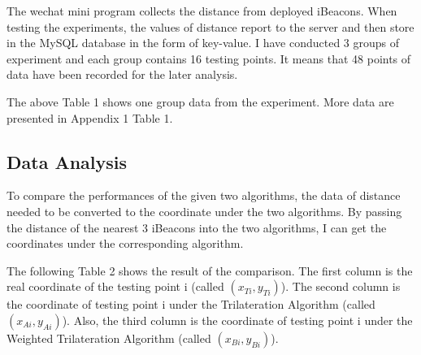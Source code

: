 \documentclass{sigchi}
\begin{document}
The wechat mini program collects the distance from deployed iBeacons. When testing the experiments, the values of distance report to the server and then store in the MySQL database in the form of key-value. I have conducted 3 groups of experiment and each group contains 16 testing points. It means that 48 points of data have been recorded for the later analysis. 

The above Table 1 shows one group data from the experiment. More data are presented in Appendix 1 Table 1.

\subsection{Data Analysis}
To compare the performances of the given two algorithms, the data of distance needed to be converted to the coordinate under the two algorithms. By passing the distance of the nearest 3 iBeacons into the two algorithms, I can get the coordinates under the corresponding algorithm.

The following Table 2 shows the result of the comparison. The first column is the real coordinate of the testing point {i} (called $(x_{Ti}, y_{Ti})$). The second column is the coordinate of testing point {i} under the Trilateration Algorithm (called $(x_{Ai}, y_{Ai})$). Also, the third column is the coordinate of testing point {i} under the Weighted Trilateration Algorithm (called $(x_{Bi}, y_{Bi})$).
\end{document}
